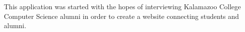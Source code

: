 \documentclass[12pt]{article}
\begin{document}
	\bigskip
	This application was started with the hopes of interviewing Kalamazoo College Computer Science alumni in order to create a website connecting students and alumni.
	 
	 
	
	

	

	\nocite{*}
	
	
	
	
	
		
\end{document}
